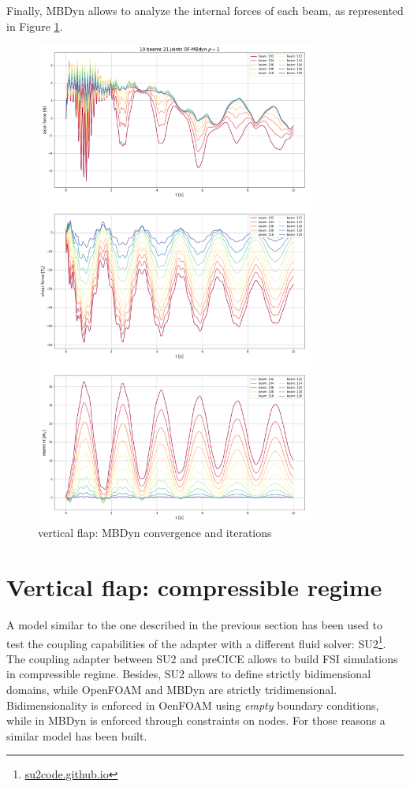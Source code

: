 Finally, MBDyn allows to analyze the internal forces of each beam, as represented in Figure \ref{fig:vf_mbd_internal}.

\begin{figure}[htbp!]
	\centering
	\includegraphics[width=0.82\textwidth]{images/vert_flap/OF-MBDyn_rho1_act.png}
	\caption{vertical flap: MBDyn convergence and iterations}
	\label{fig:vf_mbd_internal}
\end{figure}


\newpage

\section{Vertical flap: compressible regime}
\label{sec:su2-mbd}

A model similar to the one described in the previous section has been used to test the coupling capabilities of the adapter with a different fluid solver: SU2\footnote{\href{https://su2code.github.io/}{su2code.github.io}}. The coupling adapter between SU2 and preCICE allows to build FSI simulations in compressible regime. Besides, SU2 allows to define strictly bidimensional domains, while OpenFOAM and MBDyn are strictly tridimensional. Bidimensionality is enforced in OenFOAM using \textit{empty} boundary conditions, while in MBDyn is enforced through constraints on nodes.
For those reasons a similar model has been built. 


